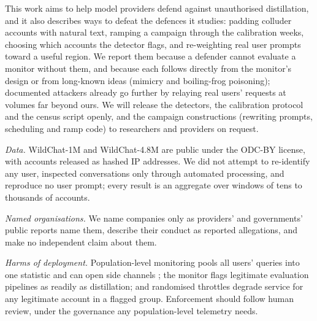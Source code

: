 This work aims to help model providers defend against unauthorised distillation, and it also describes ways to defeat the defences it studies: padding colluder accounts with natural text, ramping a campaign through the calibration weeks, choosing which accounts the detector flags, and re-weighting real user prompts toward a useful region. We report them because a defender cannot evaluate a monitor without them, and because each follows directly from the monitor's design or from long-known ideas (mimicry and boiling-frog poisoning); documented attackers already go further by relaying real users' requests at volumes far beyond ours. We will release the detectors, the calibration protocol and the census script openly, and the campaign constructions (rewriting prompts, scheduling and ramp code) to researchers and providers on request.

\emph{Data.} WildChat-1M and WildChat-4.8M are public under the ODC-BY license, with accounts released as hashed IP addresses. We did not attempt to re-identify any user, inspected conversations only through automated processing, and reproduce no user prompt; every result is an aggregate over windows of tens to thousands of accounts.

\emph{Named organisations.} We name companies only as providers' and governments' public reports name them, describe their conduct as reported allegations, and make no independent claim about them.

\emph{Harms of deployment.} Population-level monitoring pools all users' queries into one statistic and can open side channels \citep{debenedetti2024privacy}; the monitor flags legitimate evaluation pipelines as readily as distillation; and randomised throttles degrade service for any legitimate account in a flagged group. Enforcement should follow human review, under the governance any population-level telemetry needs.
